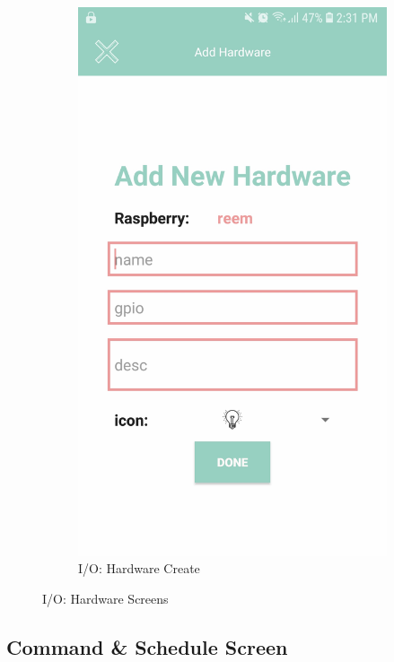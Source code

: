\documentclass[12pt]{paper}
\begin{document}
\begin{figure}[H]
\begin{subfigure}[b]{.35\linewidth}
				\includegraphics[width=\linewidth]{img/output_hardware_new.jpg}
				\caption{I/O: Hardware Create}
			\end{subfigure}
			\caption{I/O: Hardware Screens}
			\label{output:hardware}
		\end{figure}
		
		\newpage\subsection{Command \& Schedule Screen}
\end{document}
